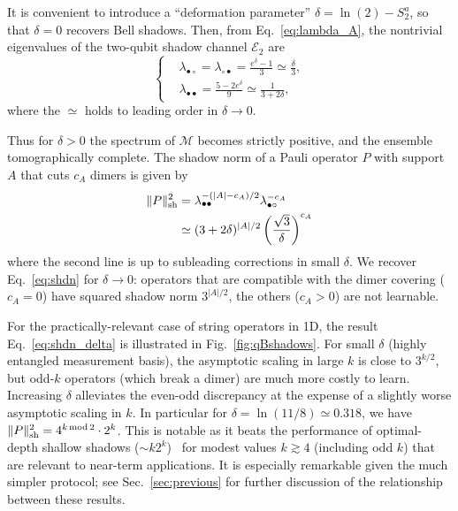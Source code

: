 \documentclass[a4paper,twocolumns,11pt,accepted=2024-03-04]{quantumarticle}
\newcommand{\shadownorm}[1]{\ensuremath{\| #1 \|_{\rm sh}}}
\begin{document}
It is convenient to introduce a ``deformation parameter'' $\delta = \ln(2) - S_2^a$, so that $\delta = 0$ recovers Bell shadows. Then, from Eq.~\eqref{eq:lambda_A}, the nontrivial eigenvalues of the two-qubit shadow channel $\mathcal{E}_2$ are
\begin{equation}
    \left\{ 
    \begin{aligned}
    & \lambda_{\bullet\circ} =
    \lambda_{\circ \bullet} = 
    \frac{e^\delta-1}{3}\simeq \frac{\delta}{3}, \\
    & \lambda_{\bullet \bullet} = \frac{5-2e^\delta}{9} \simeq \frac{1}{3+2\delta},
    \end{aligned} 
    \right.
    \label{eq:evals2}
\end{equation}
where the $\simeq$ holds to leading order in $\delta \to 0$. 

Thus for $\delta >0$ the spectrum of $\mathcal{M}$ becomes strictly positive, and the ensemble tomographically complete.
The shadow norm of a Pauli operator $P$ with support $A$ that cuts $c_A$ dimers is given by 
\begin{align} 
    \shadownorm{P}^2 
    & = \lambda_{\bullet\bullet}^{-(|A|-c_A)/2} \lambda_{\bullet\circ}^{-c_A} \label{eq:shdn_delta} \\
    & \simeq (3+2\delta)^{|A|/2} \left(\frac{\sqrt{3}}{\delta} \right)^{c_A}
    \label{eq:shdn_delta_approx}
\end{align}
where the second line is up to subleading corrections in small $\delta$.
We recover Eq.~\eqref{eq:shdn} for $\delta \to 0$: operators that are compatible with the dimer covering ($c_A=0$) have squared shadow norm $3^{|A|/2}$, the others ($c_A>0$) are not learnable.

For the practically-relevant case of string operators in 1D, the result Eq.~\eqref{eq:shdn_delta} is illustrated in Fig.~\ref{fig:qBshadows}.
For small $\delta$ (highly entangled measurement basis), the asymptotic scaling in large $k$ is close to $3^{k/2}$, but odd-$k$ operators (which break a dimer) are much more costly to learn.
Increasing $\delta$ alleviates the even-odd discrepancy at the expense of a slightly worse asymptotic scaling in $k$.
In particular for $\delta = \ln(11/8) \simeq 0.318$, we have $\shadownorm{P}^2 = 4^{k\, {\rm mod}\, 2} \cdot 2^k$.
This is notable as it beats the performance of optimal-depth shallow shadows ($\sim k 2^k$)~\cite{ippoliti_operator_2023} for modest values $k\gtrsim 4$ (including odd $k$) that are relevant to near-term applications. It is especially remarkable given the much simpler protocol; see Sec.~\ref{sec:previous} for further discussion of the relationship between these results.
\end{document}
